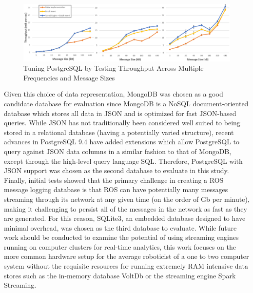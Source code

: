 \documentclass[nocopyrightspace]{acm_proc_article-sp}
\begin{document}
\begin{figure}
    \centering
    \includegraphics[width=\linewidth]{images/tuning}
    \caption{Tuning PostgreSQL by Testing Throughput Across Multiple Frequencies and Message Sizes}
    \label{fig:tuning}
\end{figure}

Given this choice of data representation, MongoDB was chosen as a good candidate database for evaluation since MongoDB is a NoSQL document-oriented database which stores all data in JSON and is optimized for fast JSON-based queries. While JSON has not traditionally been considered well suited to being stored in a relational database (having a potentially varied structure), recent advances in PostgreSQL 9.4 have added extensions which allow PostgreSQL to query against JSON data columns in a similar fashion to that of MongoDB, except through the high-level query language SQL. Therefore, PostgreSQL with JSON support was chosen as the second database to evaluate in this study. Finally, initial tests showed that the primary challenge in creating a ROS message logging database is that ROS can have potentially many messages streaming through its network at any given time (on the order of Gb per minute), making it challenging to persist all of the messages in the network as fast as they are generated. For this reason, SQLite3, an embedded database designed to have minimal overhead, was chosen as the third database to evaluate. While future work should be conducted to examine the potential of using streaming engines running on computer clusters for real-time analytics, this work focuses on the more common hardware setup for the average roboticist of a one to two computer system without the requisite resources for running extremely RAM intensive data stores such as the in-memory database VoltDb or the streaming engine Spark Streaming.
\end{document}
